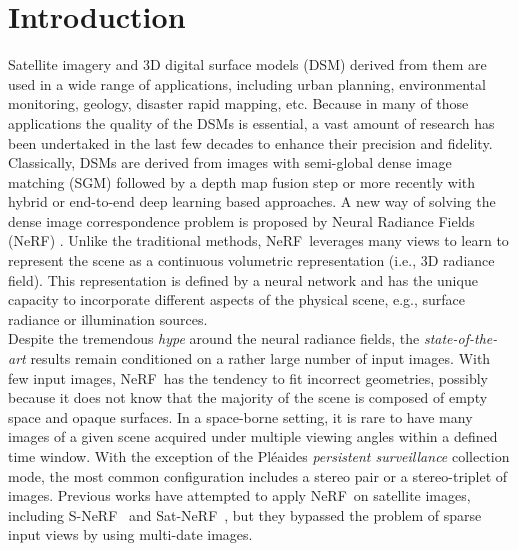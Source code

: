 \documentclass{isprs} %
\newcommand{\Nerf}{{NeRF}}
\begin{document}
\maketitle


\section{Introduction}
Satellite imagery and 3D digital surface models (DSM) derived from them are used in a wide range of applications, including urban planning, environmental monitoring, geology, disaster rapid mapping, etc. Because in many of those applications the quality of the DSMs is essential, a vast amount of research has been undertaked in the last few decades to enhance their precision and fidelity.\\
Classically, DSMs are derived from images with semi-global dense image matching \cite{hirschmuller2005accurate,pierrot2006multiresolution} (SGM) followed by a depth map fusion step \cite{rupnik20183d} or more recently with hybrid \cite{konrad2017} or end-to-end \cite{PSMNet} deep learning based approaches. A new way of solving the dense image correspondence problem is proposed by Neural Radiance Fields (\Nerf) \cite{Mildenhall20eccv_nerf}. Unlike the traditional methods, \Nerf~leverages many views to learn to represent the scene as a continuous volumetric representation (i.e., 3D radiance field). This representation is defined by a neural network and has the unique capacity to incorporate different aspects of the physical scene, e.g., surface radiance or illumination sources.\\
Despite the tremendous \textit{hype} around the neural radiance fields, the \textit{state-of-the-art} results remain conditioned on a rather large number of input images. With few input images, \Nerf~has the tendency to fit incorrect geometries, possibly because it does not know that the majority of the scene is composed of empty space and opaque surfaces. In a space-borne setting, it is rare to have many images of a given scene acquired under multiple viewing angles within a defined time window. With the exception of the Pléaides \textit{persistent surveillance} collection mode, the most common configuration includes a stereo pair or a stereo-triplet of images. Previous works have attempted to apply \Nerf~on satellite images, including S-\Nerf~\cite{derksen2021shadow} and Sat-\Nerf~\cite{mari2022sat}, but they bypassed the problem of sparse input views by using multi-date images. %
\end{document}
